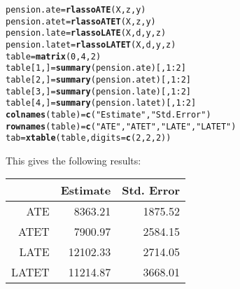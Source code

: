 \documentclass{amsart}\usepackage[]{graphicx}\usepackage[]{color}
\makeatletter
\newcommand{\hlnum}[1]{\textcolor[rgb]{0.686,0.059,0.569}{#1}}%
\newcommand{\hlstr}[1]{\textcolor[rgb]{0.192,0.494,0.8}{#1}}%
\newcommand{\hlopt}[1]{\textcolor[rgb]{0,0,0}{#1}}%
\newcommand{\hlstd}[1]{\textcolor[rgb]{0.345,0.345,0.345}{#1}}%
\newcommand{\hlkwb}[1]{\textcolor[rgb]{0.69,0.353,0.396}{#1}}%
\newcommand{\hlkwc}[1]{\textcolor[rgb]{0.333,0.667,0.333}{#1}}%
\newcommand{\hlkwd}[1]{\textcolor[rgb]{0.737,0.353,0.396}{\textbf{#1}}}%
\newenvironment{kframe}{%
 \def\at@end@of@kframe{}%
 \ifinner\ifhmode%
  \def\at@end@of@kframe{\end{minipage}}%
  \begin{minipage}{\columnwidth}%
 \fi\fi%
 \def\FrameCommand##1{\hskip\@totalleftmargin \hskip-\fboxsep
 \colorbox{shadecolor}{##1}\hskip-\fboxsep
     \hskip-\linewidth \hskip-\@totalleftmargin \hskip\columnwidth}%
 \MakeFramed {\advance\hsize-\width
   \@totalleftmargin\z@ \linewidth\hsize
   \@setminipage}}%
 {\par\unskip\endMakeFramed%
 \at@end@of@kframe}
\newenvironment{knitrout}{}{} %
\makeatother
\begin{document}
\begin{knitrout}
\color{fgcolor}\begin{kframe}
\begin{alltt}
\hlstd{pension.ate} \hlkwb{=}  \hlkwd{rlassoATE}\hlstd{(X,z,y)}
\hlstd{pension.atet} \hlkwb{=}  \hlkwd{rlassoATET}\hlstd{(X,z,y)}
\hlstd{pension.late} \hlkwb{=} \hlkwd{rlassoLATE}\hlstd{(X,d,y,z)}
\hlstd{pension.latet} \hlkwb{=} \hlkwd{rlassoLATET}\hlstd{(X,d,y,z)}
\hlstd{table}\hlkwb{=} \hlkwd{matrix}\hlstd{(}\hlnum{0}\hlstd{,} \hlnum{4}\hlstd{,} \hlnum{2}\hlstd{)}
\hlstd{table[}\hlnum{1}\hlstd{,]}\hlkwb{=} \hlkwd{summary}\hlstd{(pension.ate)[,}\hlnum{1}\hlopt{:}\hlnum{2}\hlstd{]}
\hlstd{table[}\hlnum{2}\hlstd{,]}\hlkwb{=} \hlkwd{summary}\hlstd{(pension.atet)[,}\hlnum{1}\hlopt{:}\hlnum{2}\hlstd{]}
\hlstd{table[}\hlnum{3}\hlstd{,]}\hlkwb{=} \hlkwd{summary}\hlstd{(pension.late)[,}\hlnum{1}\hlopt{:}\hlnum{2}\hlstd{]}
\hlstd{table[}\hlnum{4}\hlstd{,]}\hlkwb{=} \hlkwd{summary}\hlstd{(pension.latet)[,}\hlnum{1}\hlopt{:}\hlnum{2}\hlstd{]}
\hlkwd{colnames}\hlstd{(table)}\hlkwb{=} \hlkwd{c}\hlstd{(}\hlstr{"Estimate"}\hlstd{,} \hlstr{"Std. Error"}\hlstd{)}
\hlkwd{rownames}\hlstd{(table)}\hlkwb{=} \hlkwd{c}\hlstd{(}\hlstr{"ATE"}\hlstd{,}  \hlstr{"ATET "}\hlstd{,} \hlstr{"LATE"}\hlstd{,} \hlstr{"LATET"}\hlstd{)}
\hlstd{tab}\hlkwb{=} \hlkwd{xtable}\hlstd{(table,} \hlkwc{digits}\hlstd{=}\hlkwd{c}\hlstd{(}\hlnum{2}\hlstd{,} \hlnum{2}\hlstd{,}\hlnum{2}\hlstd{))}
\end{alltt}
\end{kframe}
\end{knitrout}

This gives the following results:

\begin{table}[ht]
\centering
\begin{tabular}{rrr}
  \hline
 & Estimate & Std. Error \\ 
  \hline
ATE & 8363.21 & 1875.52 \\ 
  ATET  & 7900.97 & 2584.15 \\ 
  LATE & 12102.33 & 2714.05 \\ 
  LATET & 11214.87 & 3668.01 \\ 
   \hline
\end{tabular}
\end{table}


\newpage
\end{document}
